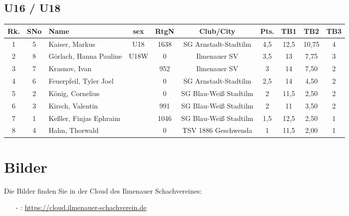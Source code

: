 \documentclass[a4paper,ngerman]{tui-algo-seminar}
\begin{document}
\subsection{U16 / U18}
	\begin{center}
	\begin{tabular}{|c|c|l|c|c|c|c|c|c|c|}
		\hline
		\textbf{Rk.} & \textbf{SNo} & \textbf{Name} & \textbf{sex} & \textbf{RtgN} & \textbf{Club/City} & \textbf{Pts.} & \textbf{TB1} & \textbf{TB2} & \textbf{TB3} \\
		\hline
		1 & 5 & Kaiser, Markus & U18 & 1638 & SG Arnstadt-Stadtilm & 4,5 & 12,5 & 10,75 & 4 \\
		2 & 8 & Görlach, Hanna Pauline & U18W & 0 & Ilmenauer SV & 3,5 & 13 & 7,75 & 3 \\
		3 & 7 & Krasnov, Ivan & & 952 & Ilmenauer SV & 3 & 14 & 7,50 & 2 \\
		4 & 6 & Feuerpfeil, Tyler Joel & & 0 & SG Arnstadt-Stadtilm & 2,5 & 14 & 4,50 & 2 \\
		5 & 2 & König, Cornelius & & 0 & SG Blau-Weiß Stadtilm & 2 & 11,5 & 2,50 & 2 \\
		6 & 3 & Kirsch, Valentin & & 991 & SG Blau-Weiß Stadtilm & 2 & 11 & 3,50 & 2 \\
		7 & 1 & Keßler, Finjas Ephraim & & 1046 & SG Blau-Weiß Stadtilm & 1,5 & 12,5 & 2,50 & 1 \\
		8 & 4 & Hahn, Thorwald & & 0 & TSV 1886 Geschwenda & 1 & 11,5 & 2,00 & 1 \\
		\hline
	\end{tabular}
\end{center}

\section{Bilder}
Die Bilder finden Sie in der Cloud des Ilmenauer Schachvereines: 
\begin{itemize}
	\item[-]: \url{https://cloud.ilmenauer-schachverein.de}
\end{itemize}
\end{document}
